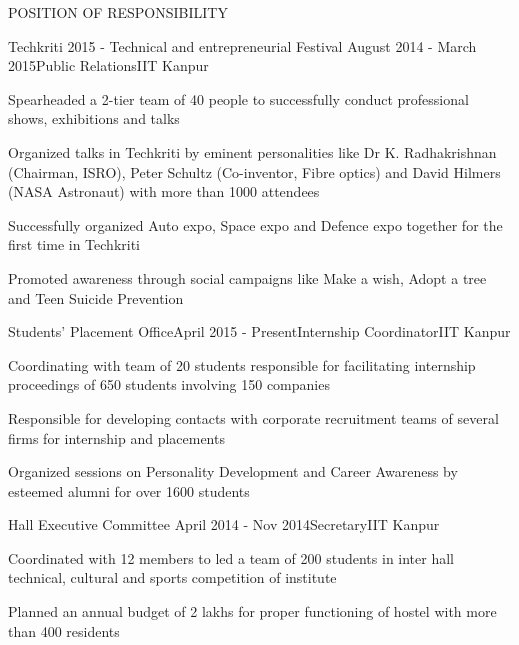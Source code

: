 \documentclass{article}
\begin{document}
\begin{rSection}{POSITION OF RESPONSIBILITY}

\begin{rSubsection}{Techkriti 2015 - Technical and entrepreneurial Festival }{August 2014 - March 2015}{Public Relations}{IIT Kanpur}
\item Spearheaded a 2-tier team of 40 people to successfully conduct professional shows, exhibitions and talks
\item Organized talks in Techkriti by eminent personalities like Dr K. Radhakrishnan (Chairman, ISRO), Peter Schultz (Co-inventor, Fibre optics) and David Hilmers (NASA Astronaut) with more than 1000 attendees
\item Successfully organized Auto expo, Space expo and Defence expo together for the first time in Techkriti
\item Promoted awareness through social campaigns like Make a wish, Adopt a tree and Teen Suicide Prevention
\end{rSubsection}


\begin{rSubsection}{Students' Placement Office}{April 2015 - Present}{Internship Coordinator}{IIT Kanpur}
\item Coordinating with team of 20 students responsible for facilitating internship proceedings of 650 students involving 150 companies
 \item Responsible for developing contacts with corporate recruitment teams of several firms for internship and placements 
 \item Organized sessions on Personality Development and Career Awareness by esteemed alumni for over 1600 students
\end{rSubsection}


\begin{rSubsection}{Hall Executive Committee }{April 2014 - Nov 2014}{Secretary}{IIT Kanpur}
\item Coordinated with 12 members to led a team of 200 students in inter hall technical, cultural and sports competition of institute 
\item Planned an annual budget of   2 lakhs for proper functioning of hostel with more than 400 residents
\end{rSubsection}

\end{rSection}
\end{document}
